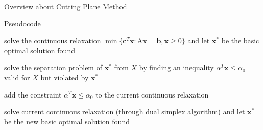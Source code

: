 \documentclass[9pt]{extarticle}
\begin{document}
\begin{section}{Overview about Cutting Plane Method}
\begin{subsection}{Pseudocode}
            \begin{algorithm}
                \caption{Cutting Plane Algorithm}\label{alg:cuttingplane}
                \begin{algorithmic}[1]
                        \State \parbox[t]{.8\linewidth}{%
                            solve the continuous relaxation 
                            $\min\{\mathbf{c}^{T}\mathbf{x} : \text{A}\mathbf{x} = \mathbf{b}, \mathbf{x} \ge 0\}$
                            and let $\mathbf{x^*}$ be the basic optimal solution found
                        }
                            \State \parbox[t]{.8\linewidth}{%
                                solve the separation problem of $\mathbf{x^*}$ from $X$ by finding an inequality
                                $\alpha^{T}\mathbf{x} \leq \alpha_0$ valid for $X$ but violated by $\mathbf{x^*}$
                            }
                            \State add the constraint $\alpha^{T}\mathbf{x} \leq \alpha_0$ to the current continuous relaxation
                            \State \parbox[t]{.8\linewidth}{%
                                solve current continuous relaxation (through dual simplex algorithm) and let $\mathbf{x^*}$ 
                                be the new basic optimal solution found
                            }
                        \EndWhile
                    \EndProcedure
                \end{algorithmic}   
            \end{algorithm}    
            \vspace{10px}     
        \end{subsection}
    \end{section}
\end{document}
